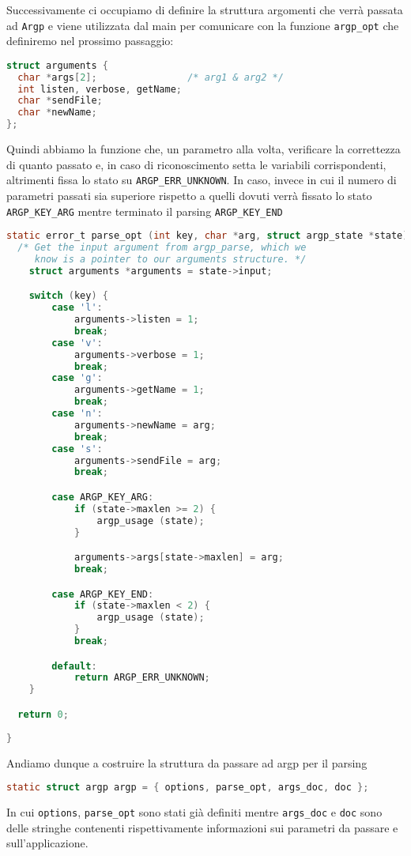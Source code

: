 \documentclass[11pt,fleqn]{book} %
\begin{document}
Successivamente ci occupiamo di definire la struttura argomenti che verrà passata ad \texttt{Argp} e viene utilizzata dal main per comunicare con la funzione \texttt{argp\_opt} che definiremo nel prossimo passaggio:
\begin{lstlisting}[language=C]
struct arguments {
  char *args[2];                /* arg1 & arg2 */
  int listen, verbose, getName;
  char *sendFile;
  char *newName;
};
\end{lstlisting}

\noindent Quindi abbiamo la funzione che, un parametro alla volta, verificare la correttezza di quanto passato e, in caso di riconoscimento setta le variabili corrispondenti, altrimenti fissa lo stato su \texttt{ARGP\_ERR\_UNKNOWN}.
In caso, invece in cui il numero di parametri passati sia superiore rispetto a quelli dovuti verrà fissato lo stato \texttt{ARGP\_KEY\_ARG} mentre terminato il parsing \texttt{ARGP\_KEY\_END}

\begin{lstlisting}[language=C]
static error_t parse_opt (int key, char *arg, struct argp_state *state) {
  /* Get the input argument from argp_parse, which we
     know is a pointer to our arguments structure. */
  	struct arguments *arguments = state->input;

  	switch (key) {
    	case 'l':
      		arguments->listen = 1;
      		break;
    	case 'v':
      		arguments->verbose = 1;
      		break;
    	case 'g':
      		arguments->getName = 1;
      		break;
    	case 'n':
      		arguments->newName = arg;
      		break;
    	case 's':
      		arguments->sendFile = arg;
      		break;

    	case ARGP_KEY_ARG:
      		if (state->maxlen >= 2) {
        		argp_usage (state);
        	}

      		arguments->args[state->maxlen] = arg;
      		break;

    	case ARGP_KEY_END:
      		if (state->maxlen < 2) {
     			argp_usage (state);
     		}
      		break;

    	default:
      		return ARGP_ERR_UNKNOWN;
    }

  return 0;
  
}

\end{lstlisting}

\noindent Andiamo dunque a costruire la struttura da passare ad argp per il parsing
\begin{lstlisting}[language=C]
static struct argp argp = { options, parse_opt, args_doc, doc };
\end{lstlisting}
\noindent In cui \texttt{options}, \texttt{parse\_opt} sono stati già definiti mentre \texttt{args\_doc} e \texttt{doc} sono delle stringhe contenenti rispettivamente informazioni sui parametri da passare e sull'applicazione.
\end{document}
